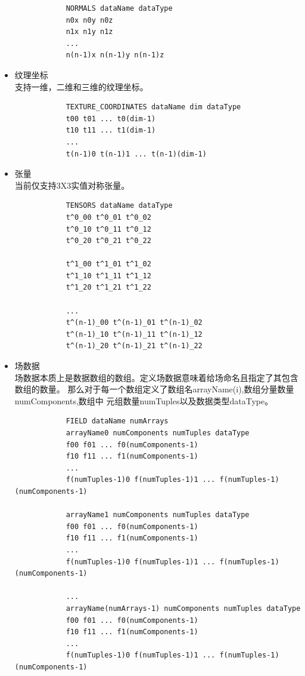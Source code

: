 \documentclass[UTF8]{ctexart}
\begin{document}
\begin{itemize}
{        \begin{verbatim}
            NORMALS dataName dataType
            n0x n0y n0z
            n1x n1y n1z
            ... 
            n(n-1)x n(n-1)y n(n-1)z 
        \end{verbatim}
    }
    \item {
        纹理坐标\\
        支持一维，二维和三维的纹理坐标。
        \begin{verbatim}
            TEXTURE_COORDINATES dataName dim dataType
            t00 t01 ... t0(dim-1)
            t10 t11 ... t1(dim-1)
            ... 
            t(n-1)0 t(n-1)1 ... t(n-1)(dim-1)
        \end{verbatim}
    }
    \item {
        张量\\
        当前仅支持3X3实值对称张量。
        \begin{verbatim}
            TENSORS dataName dataType
            t^0_00 t^0_01 t^0_02
            t^0_10 t^0_11 t^0_12
            t^0_20 t^0_21 t^0_22

            t^1_00 t^1_01 t^1_02
            t^1_10 t^1_11 t^1_12
            t^1_20 t^1_21 t^1_22
            
            ...
            t^(n-1)_00 t^(n-1)_01 t^(n-1)_02
            t^(n-1)_10 t^(n-1)_11 t^(n-1)_12
            t^(n-1)_20 t^(n-1)_21 t^(n-1)_22
        \end{verbatim}
    }
    \item {
        场数据\\
        场数据本质上是数据数组的数组。定义场数据意味着给场命名且指定了其包含数组的数量。
        那么对于每一个数组定义了数组名arrayName(i),数组分量数量numComponents,数组中
        元组数量numTuples以及数据类型dataType。
        \begin{verbatim}
            FIELD dataName numArrays
            arrayName0 numComponents numTuples dataType
            f00 f01 ... f0(numComponents-1)
            f10 f11 ... f1(numComponents-1)
            ...
            f(numTuples-1)0 f(numTuples-1)1 ... f(numTuples-1)(numComponents-1)

            arrayName1 numComponents numTuples dataType
            f00 f01 ... f0(numComponents-1)
            f10 f11 ... f1(numComponents-1)
            ...
            f(numTuples-1)0 f(numTuples-1)1 ... f(numTuples-1)(numComponents-1)

            ...
            arrayName(numArrays-1) numComponents numTuples dataType
            f00 f01 ... f0(numComponents-1)
            f10 f11 ... f1(numComponents-1)
            ...
            f(numTuples-1)0 f(numTuples-1)1 ... f(numTuples-1)(numComponents-1)
        \end{verbatim}
    }
\end{itemize}
\end{document}
